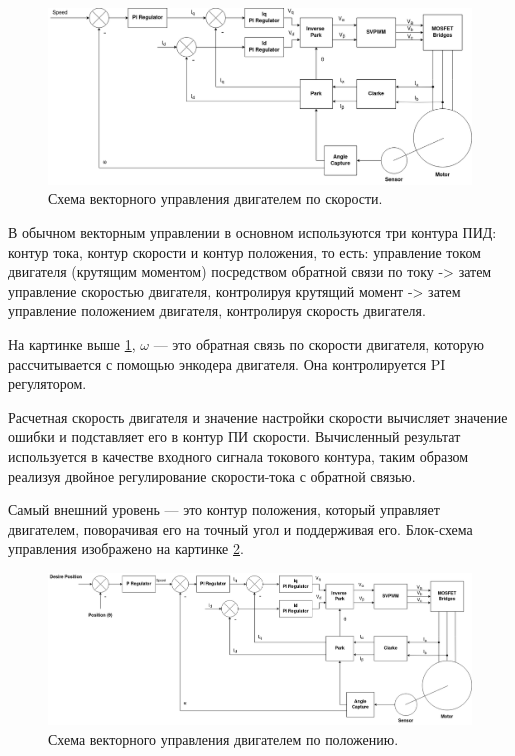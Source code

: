 \begin{figure}[H]
	\centering
	\includegraphics[width=\textwidth]{Src/images/speed.drawio.png}
	\caption{Схема векторного управления двигателем по скорости.}
	\label{ACDFOCALGSPD}
\end{figure}

В обычном векторным управлении в основном используются три контура ПИД: контур тока, контур скорости и контур положения, то есть: управление током двигателя (крутящим моментом) посредством обратной связи по току -> затем управление скоростью двигателя, контролируя крутящий момент -> затем управление положением двигателя, контролируя скорость двигателя.

На картинке выше \ref{ACDFOCALGSPD}, $\omega$  — это обратная связь по скорости двигателя, которую рассчитывается с помощью энкодера двигателя. Она контролируется PI регулятором.

Расчетная скорость двигателя и значение настройки скорости вычисляет значение ошибки и подставляет его в контур ПИ скорости. Вычисленный результат используется в качестве входного сигнала токового контура, таким образом реализуя двойное регулирование скорости-тока с обратной связью.

Самый внешний уровень — это контур положения, который управляет двигателем, поворачивая его на точный угол и поддерживая его. Блок-схема управления изображено на картинке \ref{ACDFOCALGPOS}.

\begin{figure}[H]
	\centering
	\includegraphics[width=\textwidth]{Src/images/Foc pos.drawio.png}
	\caption{Схема векторного управления двигателем по положению.}
	\label{ACDFOCALGPOS}
\end{figure}


